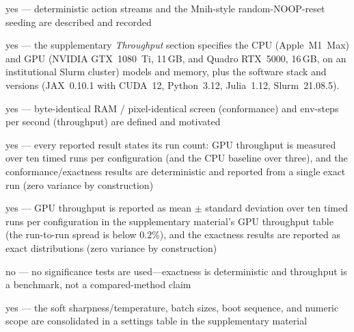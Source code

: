 \documentclass[letterpaper]{article}
\begin{document}
\begin{itemize}
\begin{itemize}
	yes --- deterministic action streams and the Mnih-style random-NOOP-reset seeding are described and recorded

	yes --- the supplementary \emph{Throughput} section specifies the CPU (Apple~M1~Max) and GPU (NVIDIA GTX~1080~Ti, 11\,GB, and Quadro RTX~5000, 16\,GB, on an institutional Slurm cluster) models and memory, plus the software stack and versions (JAX~0.10.1 with CUDA~12, Python~3.12, Julia~1.12, Slurm~21.08.5).

	yes --- byte-identical RAM / pixel-identical screen (conformance) and env-steps per second (throughput) are defined and motivated

	yes --- every reported result states its run count: GPU throughput is measured over ten timed runs per configuration (and the CPU baseline over three), and the conformance/exactness results are deterministic and reported from a single exact run (zero variance by construction)

	yes --- GPU throughput is reported as mean $\pm$ standard deviation over ten timed runs per configuration in the supplementary material's GPU throughput table (the run-to-run spread is below $0.2\%$), and the exactness results are reported as exact distributions (zero variance by construction)

	no --- no significance tests are used---exactness is deterministic and throughput is a benchmark, not a compared-method claim

	yes --- the soft sharpness/temperature, batch sizes, boot sequence, and numeric scope are consolidated in a settings table in the supplementary material


\end{itemize}
\end{itemize}
\ifreproStandalone
\end{document}
